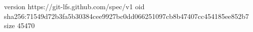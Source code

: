 version https://git-lfs.github.com/spec/v1
oid sha256:71549d72b3fa5b30384cee9927bc0dd066251097cb8b47407cc454185ee852b7
size 45470

